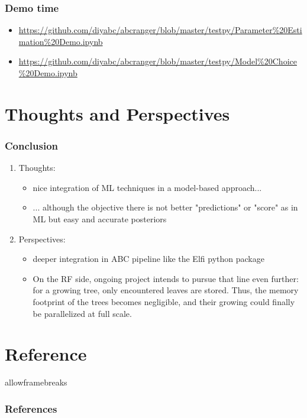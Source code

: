 \documentclass{beamer}
\newcommand{\realemph}[1]{\mybox{\textit{#1}}}
\begin{document}
    \begin{frame}
        \frametitle{Demo time}
        \begin{itemize}
            \item \url{https://github.com/diyabc/abcranger/blob/master/testpy/Parameter\%20Estimation\%20Demo.ipynb}
            \item \url{https://github.com/diyabc/abcranger/blob/master/testpy/Model\%20Choice\%20Demo.ipynb}
        \end{itemize}
    \end{frame}

    \section{Thoughts and Perspectives}
    \begin{frame}
        \frametitle{Conclusion}
        \begin{enumerate}
            \item Thoughts:
                \begin{itemize}
                    \item nice integration of ML techniques in a model-based approach...
                    \item ... although the objective there is not better "predictions" or "score" as in ML but easy and accurate posteriors
                \end{itemize}
            \item Perspectives:
                \begin{itemize}
                    \item deeper integration in ABC pipeline like the Elfi python package
                    \item On the RF side, ongoing project \realemph{LeafLitter} intends to pursue that line even further: for a growing tree, only encountered leaves are stored. Thus, the memory footprint of the trees becomes negligible, and their growing could finally be parallelized at full scale.
                \end{itemize}
        \end{enumerate}
    \end{frame}

    \section{Reference}
    \begin{frame}{allowframebreaks}
        \frametitle{References}
        \nocite{*}
        \fontsize{10pt}{7.2}\selectfont

        
    \end{frame}
\end{document}
